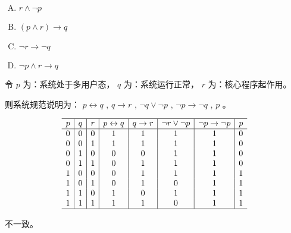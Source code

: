 {{        %
        \begin{practices}
            \begin{enumerate}[A.]
                \item $r \wedge \neg p$
                \item $(p \wedge r) \rightarrow q$
                \item $\neg r \rightarrow \neg q$
                \item $\neg p \wedge r \rightarrow q$
            \end{enumerate}
        \end{practices}

        \begin{practices}
            令 $p$ 为：系统处于多用户态， $q$ 为：系统运行正常， $r$ 为：核心程序起作用。

            则系统规范说明为： $p \leftrightarrow q$ , $q \rightarrow r$ , $\neg q \vee \neg p$ , $\neg p \rightarrow \neg q$ , $p$ 。

            \begin{table}[H]
                \[
                    \begin{array}{c|c|c|c|c|c|c|c}
                        \hline
                        p & q & r & p \leftrightarrow q & q \rightarrow r & \neg r \vee \neg p & \neg p \rightarrow \neg p & p \\
                        \hline
                        0 & 0 & 0 & 1 & 1 & 1 & 1 & 0 \\
                        0 & 0 & 1 & 1 & 1 & 1 & 1 & 0 \\
                        0 & 1 & 0 & 0 & 0 & 1 & 1 & 0 \\
                        0 & 1 & 1 & 0 & 1 & 1 & 1 & 0 \\
                        1 & 0 & 0 & 0 & 1 & 1 & 1 & 1 \\
                        1 & 0 & 1 & 0 & 1 & 0 & 1 & 1 \\
                        1 & 1 & 0 & 1 & 0 & 1 & 1 & 1 \\
                        1 & 1 & 1 & 1 & 1 & 0 & 1 & 1 \\
                        \hline
                    \end{array}
                \]
            \end{table}

            不一致。
        \end{practices}

}}
